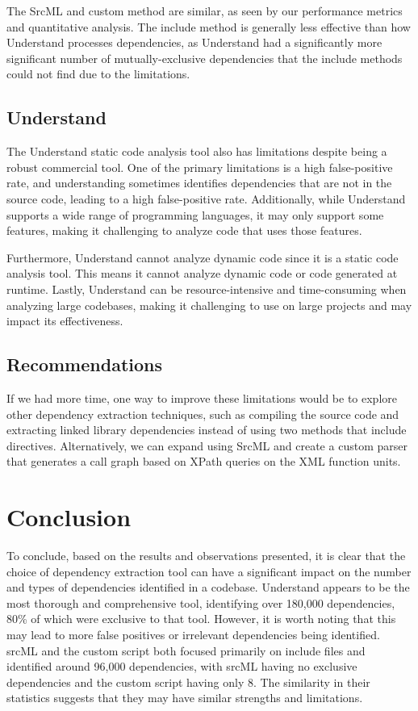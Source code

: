\documentclass[12pt, dvipsnames, a4paper]{article}
\begin{document}
The SrcML and custom method are similar, as seen by our performance metrics and quantitative analysis. The include method is generally less effective than how Understand processes dependencies, as Understand had a significantly more significant number of mutually-exclusive dependencies that the include methods could not find due to the limitations.

\subsection{Understand}
The Understand static code analysis tool also has limitations despite being a robust commercial tool. One of the primary limitations is a high false-positive rate, and understanding sometimes identifies dependencies that are not in the source code, leading to a high false-positive rate. Additionally, while Understand supports a wide range of programming languages, it may only support some features, making it challenging to analyze code that uses those features.

Furthermore, Understand cannot analyze dynamic code since it is a static code analysis tool. This means it cannot analyze dynamic code or code generated at runtime. Lastly, Understand can be resource-intensive and time-consuming when analyzing large codebases, making it challenging to use on large projects and may impact its effectiveness.

\subsection{Recommendations}
If we had more time, one way to improve these limitations would be to explore other dependency extraction techniques, such as compiling the source code and extracting linked library dependencies instead of using two methods that include directives. Alternatively, we can expand using SrcML and create a custom parser that generates a call graph based on XPath queries on the XML function units.
\clearpage

\section{Conclusion}
To conclude, based on the results and observations presented, it is clear that the choice of dependency extraction tool can have a significant impact on the number and types of dependencies identified in a codebase. Understand appears to be the most thorough and comprehensive tool, identifying over 180,000 dependencies, 80\% of which were exclusive to that tool. However, it is worth noting that this may lead to more false positives or irrelevant dependencies being identified. srcML and the custom script both focused primarily on include files and identified around 96,000 dependencies, with srcML having no exclusive dependencies and the custom script having only 8. The similarity in their statistics suggests that they may have similar strengths and limitations.
\end{document}
